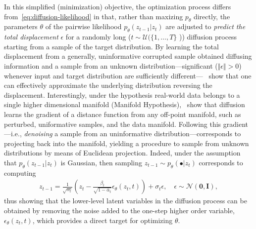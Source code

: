 In this simplified (minimization) objective, the optimization process differs from~\ref{eq:diffusion-likelihood} in that, rather than maxizing \( p_\theta \) directly, the parameters \( \theta \) of the pairwise likelihood \( p_\theta(z_{t-1} \vert z_t) \) are adjusted to \emph{predict the total displacement} \( \epsilon \) for a randomly long (\( t \sim \mathcal{U}(\{1,\dots,T\} \) )) diffusion process starting from a sample of the target distribution.
By learning the total displacement from a generally, uninformative corrupted sample obtained diffusing information and a sample from an unknown distribution---significant (\( \Vert \epsilon \Vert > 0 \)) whenever input and target distribution are sufficiently different---~\citet{hoDenoisingDiffusionProbabilistic2020} show that one can effectively approximate the underlying distribution reversing the displacement. 
Interestingly, under the hypothesis real-world data belongs to a single higher dimensional manifold (Manifold Hypothesis),~\citet{permenterInterpretingImprovingDiffusion2024} show that diffusion learns the gradient of a distance function from any off-point manifold, such as perturbed, uniformative samples, and the data manifold.
Following this gradient---i.e., \emph{denoising} a sample from an uninformative distribution---corresponds to projecting back into the manifold, yielding a procedure to sample from unknown distributions by means of Euclidean projection.
Indeed, under the assumption that \(p_\theta (z_{t-1} \vert z_t) \) is Gaussian, then sampling \(z_{t-1} \sim p_\theta(\bullet \vert z_{t}) \) corresponds to computing
\begin{align}
    z_{t-1} = \frac{1}{\sqrt{\alpha_t}} \left( z_t - \frac{\beta_t}{\sqrt{1 - \bar\alpha_t}} \epsilon_\theta(z_t, t) \right) + \sigma_t \epsilon, \quad \epsilon \sim \mathcal N(\mathbf{0}, \mathbf{I}), \label{eq:diffusion-denoising-definition}
\end{align}
thus showing that the lower-level latent variables in the diffusion process can be obtained by removing the noise added to the one-step higher order variable, \( \epsilon_\theta(z_t, t)\), which provides a direct target for optimizing \( \theta \).

